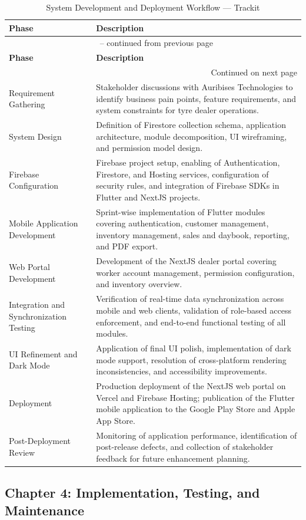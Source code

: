\documentclass[12pt, oneside]{article}
\begin{document}
\renewcommand{\arraystretch}{1.5}
\begin{longtable}{|p{3.8cm}|p{9.8cm}|}
\caption{System Development and Deployment Workflow — Trackit} \label{tab:workflow} \\
\hline
\textbf{Phase} & \textbf{Description} \\
\hline
\endfirsthead
\multicolumn{2}{c}{{\tablename\ \thetable{} -- continued from previous page}} \\
\hline
\textbf{Phase} & \textbf{Description} \\
\hline
\endhead
\hline \multicolumn{2}{|r|}{{Continued on next page}} \\ \hline
\endfoot
\hline
\endlastfoot
Requirement Gathering & Stakeholder discussions with Auribises Technologies to identify business pain points, feature requirements, and system constraints for tyre dealer operations. \\
\hline
System Design & Definition of Firestore collection schema, application architecture, module decomposition, UI wireframing, and permission model design. \\
\hline
Firebase Configuration & Firebase project setup, enabling of Authentication, Firestore, and Hosting services, configuration of security rules, and integration of Firebase SDKs in Flutter and NextJS projects. \\
\hline
Mobile Application Development & Sprint-wise implementation of Flutter modules covering authentication, customer management, inventory management, sales and daybook, reporting, and PDF export. \\
\hline
Web Portal Development & Development of the NextJS dealer portal covering worker account management, permission configuration, and inventory overview. \\
\hline
Integration and Synchronization Testing & Verification of real-time data synchronization across mobile and web clients, validation of role-based access enforcement, and end-to-end functional testing of all modules. \\
\hline
UI Refinement and Dark Mode & Application of final UI polish, implementation of dark mode support, resolution of cross-platform rendering inconsistencies, and accessibility improvements. \\
\hline
Deployment & Production deployment of the NextJS web portal on Vercel and Firebase Hosting; publication of the Flutter mobile application to the Google Play Store and Apple App Store. \\
\hline
Post-Deployment Review & Monitoring of application performance, identification of post-release defects, and collection of stakeholder feedback for future enhancement planning. \\
\hline
\end{longtable}
\newpage
\begin{center}
    \section*{Chapter 4: Implementation, Testing, and Maintenance}
\end{center}
\end{document}

